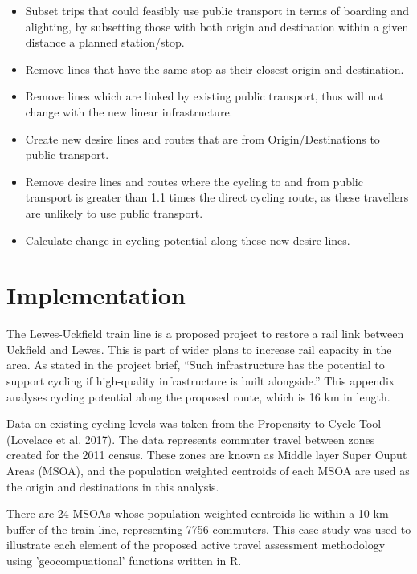 \documentclass[11pt]{article}
\begin{document}
\begin{itemize}
\item
  Subset trips that could feasibly use public transport in terms of
  boarding and alighting, by subsetting those with both origin and
  destination within a given distance a planned station/stop.
\item
  Remove lines that have the same stop as their closest origin and
  destination.
\item
  Remove lines which are linked by existing public transport, thus will
  not change with the new linear infrastructure.
\item
  Create new desire lines and routes that are from Origin/Destinations
  to public transport.
\item
  Remove desire lines and routes where the cycling to and from public
  transport is greater than 1.1 times the direct cycling route, as these
  travellers are unlikely to use public transport.
\item
  Calculate change in cycling potential along these new desire lines.
\end{itemize}

\section{Implementation}\label{a-case-study-of-lewes-uckfield}

The Lewes-Uckfield train line is a proposed project to restore a rail
link between Uckfield and Lewes. This is part of wider plans to increase
rail capacity in the area. As stated in the project brief, ``Such
infrastructure has the potential to support cycling if high-quality
infrastructure is built alongside.'' This appendix analyses cycling
potential along the proposed route, which is 16 km in length.

Data on existing cycling levels was
taken from the Propensity to Cycle Tool (Lovelace et al. 2017).
The data represents commuter travel between zones created for the 2011
census. These zones are known as Middle layer Super Ouput Areas (MSOA),
and the population weighted centroids of each MSOA are used as the
origin and destinations in this analysis.

There are 24 MSOAs whose population weighted centroids lie within a 10
km buffer of the train line, representing 7756 commuters.
This case study was used to illustrate each element of the proposed active travel assessment
methodology using 'geocompuational' functions written in R.
\end{document}
